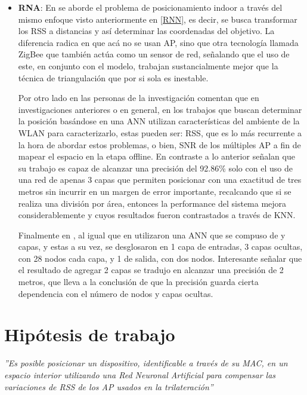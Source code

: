 \begin{enumerate}
{\begin{itemize}
{\begin{itemize}
            \item {\textbf{\ac{RNA}}: En se \cite{26} aborde el problema de posicionamiento indoor a través del mismo enfoque visto anteriormente en \ref{RNN}, es decir, se busca transformar los RSS a distancias y así determinar las coordenadas del objetivo. La diferencia radica en que acá no se usan AP, sino que otra tecnología llamada ZigBee que también actúa como un sensor de red, señalando que el uso de este, en conjunto con el modelo, trabajan sustancialmente mejor que la técnica de triangulación que por si sola es inestable.
            
            Por otro lado en \cite{27} las personas de la investigación comentan que en investigaciones anteriores o en general, en los trabajos que buscan determinar la posición basándose en una ANN utilizan características del ambiente de la \ac{WLAN} para caracterizarlo, estas pueden ser: RSS, que es lo más recurrente a la hora de abordar estos problemas, o bien, \ac{SNR} de los múltiples AP a fin de mapear el espacio en la etapa offline. En contraste a lo anterior señalan que su trabajo es capaz de alcanzar una precisión del 92.86\% solo con el uso de una red de apenas 3 capas que permiten posicionar con una exactitud de tres metros sin incurrir en un margen de error importante, recalcando que si se realiza una división por área, entonces la performance del sistema mejora considerablemente y cuyos resultados fueron contrastados a través de KNN.
            
            Finalmente en \cite{28}, al igual que en \cite{27} utilizaron una ANN que se compuso de y capas, y estas a su vez, se desglosaron en 1 capa de entradas, 3 capas ocultas, con 28 nodos cada capa, y 1 de salida, con dos nodos. Interesante señalar que el resultado de agregar 2 capas se tradujo en alcanzar una precisión de 2 metros, que lleva a la conclusión de que la precisión guarda cierta dependencia con el número de nodos y capas ocultas.}
        \end{itemize}
        }
    \end{itemize}
        }
\end{enumerate}

                \clearpage 
\section{Hipótesis de trabajo}
\begin{center}
\textit{''Es posible posicionar un dispositivo, identificable a través de su MAC, en un espacio interior utilizando una Red Neuronal Artificial para compensar las variaciones de RSS de los \ac{AP} usados en la trilateración''}
\end{center}


